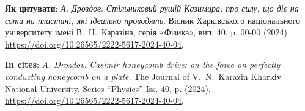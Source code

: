 \documentclass[twoside, 10pt]{article}
\def\myname{A. Drozdov}
\def\mynameukr{А. Дроздов}
\def\mytitle{Casimir honeycomb drive: on the force on perfectly conducting honeycomb on a plate}
\def\mytitleukr{Стільниковий рушій Казимира: про силу, що діє на соти на пластині, які ідеально проводять}
\def\mydoi{10.26565/2222-5617-2024-40-04}
\def\ukrvisnyk{Вісник Харківського національного університету імені В.~Н.~Каразіна, серія «Фізика», вип. 40, p. 00-00 (2024)}
\def\envisnyk{The Journal of V.~N.~Karazin Kharkiv National University. Series “Physics” Iss. 40, p. (2024)}
\begin{document}
\vspace{5mm}

\selectfont

\noindent
\textbf{Як цитувати}: \textit{\mynameukr}. \textit{\mytitleukr}. {\ukrvisnyk}. \href{https://doi.org/\mydoi}{https://doi.org/\mydoi}.

\vspace{5mm}

\selectfont

\noindent
\textbf{In cites}: \textit{\myname}. \textit{\mytitle}. {\envisnyk}. \href{https://doi.org/\mydoi}{https://doi.org/\mydoi}.

\vspace{5mm}

\newpage
\end{document}
